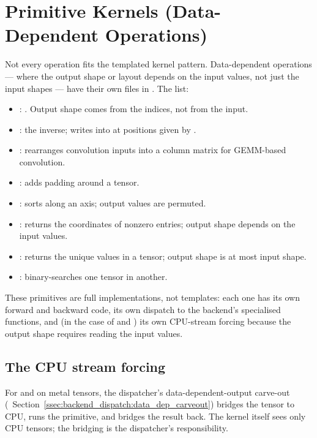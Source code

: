 \section{Primitive Kernels (Data-Dependent Operations)}
\label{sec:kernel_abstraction:primitives}

Not every operation fits the templated kernel pattern.
Data-dependent operations --- where the output shape or layout
depends on the input values, not just the input shapes --- have
their own files in . The list:

\begin{itemize}
  \item {}: .
    Output shape comes from the indices, not from the input.
  \item {}: the inverse; writes  into
     at positions given by .
  \item {}: rearranges convolution inputs into a column
    matrix for GEMM-based convolution.
  \item {}: adds padding around a tensor.
  \item {}: sorts along an axis; output values are
    permuted.
  \item {}: returns the coordinates of nonzero
    entries; output shape depends on the input values.
  \item {}: returns the unique values in a tensor;
    output shape is at most input shape.
  \item {}: binary-searches one tensor in
    another.
\end{itemize}

These primitives are full implementations, not templates: each one
has its own forward and backward code, its own dispatch to the
backend's specialised functions, and (in the case of 
and ) its own CPU-stream forcing because the output
shape requires reading the input values.

\subsection{The CPU stream forcing}
\label{ssec:kernel_abstraction:cpu_stream_force}

For  and  on metal tensors, the
dispatcher's data-dependent-output carve-out
(~Section~\ref{ssec:backend_dispatch:data_dep_carveout})
bridges the tensor to CPU, runs the primitive, and bridges the
result back. The kernel itself sees only CPU tensors; the bridging
is the dispatcher's responsibility.

